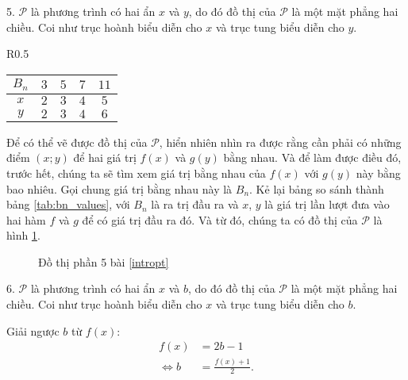 5. $\mathcal{P}$ là phương trình có hai ẩn $x$ và $y$, do đó đồ thị của $\mathcal{P}$ là một mặt phẳng hai chiều. Coi như trục hoành biểu diễn cho $x$ và trục tung biểu diễn cho $y$. 

\begin{wraptable}{R}{0.5\textwidth}
   \centering
   \begin{tabular}{|c|c|c|c|c|}
      \hline
      $B_n$ & $3$ & $5$ & $7$ & $11$ \\
      \hline
      $x$ & $2$ & $3$ & $4$ & $5$ \\
      \hline
      $y$ & $2$ & $3$ & $4$ & $6$ \\
      \hline 
   \end{tabular}
   \caption{Giá trị của $x$ và $y$ ứng với $B_n$}
   \label{tab:bn_values}
\end{wraptable}

Để có thể vẽ được đồ thị của $\mathcal{P}$, hiển nhiên nhìn ra được rằng cần phải có những điểm $(x;y)$ để hai giá trị $f(x)$ và $g(y)$ bằng nhau. Và để làm được điều đó, trước hết, chúng ta sẽ tìm xem giá trị bằng nhau của $f(x)$ với $g(y)$ này bằng bao nhiêu. Gọi chung giá trị bằng nhau này là $B_n$. Kẻ lại bảng so sánh thành bảng \ref{tab:bn_values}, với $B_n$ là ra trị đầu ra và $x$, $y$ là giá trị lần lượt đưa vào hai hàm $f$ và $g$ để có giá trị đầu ra đó. Và từ đó, chúng ta có đồ thị của $\mathcal{P}$ là hình \ref{fig:dtp5}.

\begin{figure}[h]
   \centering
   \caption{Đồ thị phần 5 bài \ref{intropt}}
   \label{fig:dtp5}
\end{figure}

6. $\mathcal{P}$ là phương trình có hai ẩn $x$ và $b$, do đó đồ thị của $\mathcal{P}$ là một mặt phẳng hai chiều. Coi như trục hoành biểu diễn cho $x$ và trục tung biểu diễn cho $b$.

Giải ngược $b$ từ $f(x)$:
\begin{align*}
   f(x) &= 2b - 1 \\
   \iff b &= \frac{f(x) + 1}{2}.
\end{align*}

